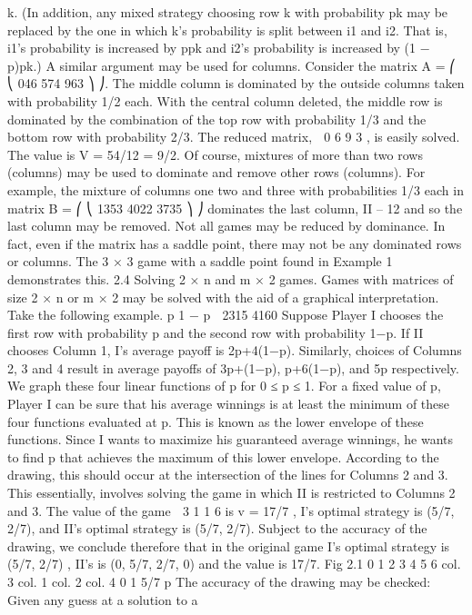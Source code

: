 k. (In addition, any mixed strategy choosing row k with probability pk may be replaced
by the one in which k’s probability is split between i1 and i2. That is, i1’s probability is
increased by ppk and i2’s probability is increased by (1 − p)pk.) A similar argument may
be used for columns.
Consider the matrix A =
⎛
⎝
046
574
963
⎞
⎠.
The middle column is dominated by the outside columns taken with probability 1/2
each. With the central column deleted, the middle row is dominated by the combination
of the top row with probability 1/3 and the bottom row with probability 2/3. The reduced
matrix,  0 6
9 3
, is easily solved. The value is V = 54/12 = 9/2.
Of course, mixtures of more than two rows (columns) may be used to dominate and
remove other rows (columns). For example, the mixture of columns one two and three
with probabilities 1/3 each in matrix B =
⎛
⎝
1353
4022
3735
⎞
⎠ dominates the last column,
II – 12
and so the last column may be removed.
Not all games may be reduced by dominance. In fact, even if the matrix has a saddle
point, there may not be any dominated rows or columns. The 3 × 3 game with a saddle
point found in Example 1 demonstrates this.
2.4 Solving 2 × n and m × 2 games. Games with matrices of size 2 × n or m × 2
may be solved with the aid of a graphical interpretation. Take the following example.
p
1 − p
 2315
4160
Suppose Player I chooses the first row with probability p and the second row with probability
1−p. If II chooses Column 1, I’s average payoff is 2p+4(1−p). Similarly, choices of
Columns 2, 3 and 4 result in average payoffs of 3p+(1−p), p+6(1−p), and 5p respectively.
We graph these four linear functions of p for 0 ≤ p ≤ 1. For a fixed value of p, Player I can
be sure that his average winnings is at least the minimum of these four functions evaluated
at p. This is known as the lower envelope of these functions. Since I wants to maximize
his guaranteed average winnings, he wants to find p that achieves the maximum of this
lower envelope. According to the drawing, this should occur at the intersection of the lines
for Columns 2 and 3. This essentially, involves solving the game in which II is restricted
to Columns 2 and 3. The value of the game  3 1
1 6
is v = 17/7 , I’s optimal strategy is
(5/7, 2/7), and II’s optimal strategy is (5/7, 2/7). Subject to the accuracy of the drawing,
we conclude therefore that in the original game I’s optimal strategy is (5/7, 2/7) , II’s is
(0, 5/7, 2/7, 0) and the value is 17/7.
Fig 2.1
0
1
2
3
4
5
6
col. 3
col. 1
col. 2
col. 4
0 1 5/7 p
The accuracy of the drawing may be checked: Given any guess at a solution to a
